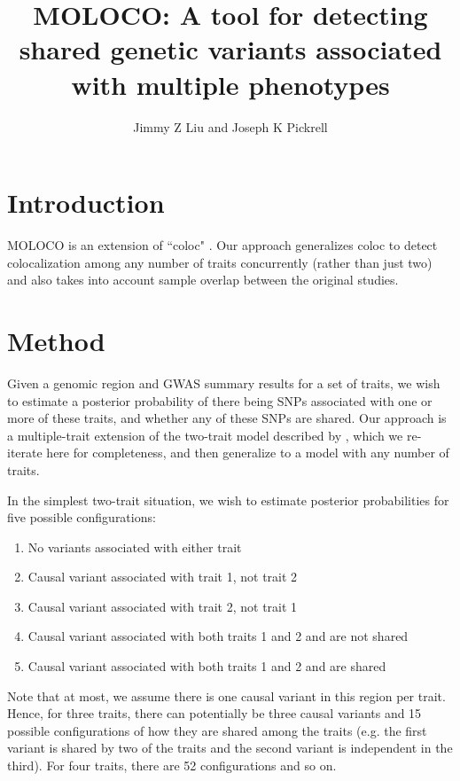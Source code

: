 \documentclass{article}
\begin{document}
\title{MOLOCO: A tool for detecting shared genetic variants associated with multiple phenotypes}
\author{Jimmy Z Liu and Joseph K Pickrell}
\maketitle


\section{Introduction}
MOLOCO is an extension of ``coloc" \citep{Giambartolomei:2014aa}. Our approach generalizes coloc to detect colocalization among any number of traits concurrently (rather than just two) and also takes into account sample overlap between the original studies.


\section{Method}

Given a genomic region and GWAS summary results for a set of traits, we wish to estimate a posterior probability of there being SNPs associated with one or more of these traits, and whether any of these SNPs are shared. Our approach is a multiple-trait extension of the two-trait model described by \cite{Giambartolomei:2014aa}, which we re-iterate here for completeness, and then generalize to a model with any number of traits.

In the simplest two-trait situation, we wish to estimate posterior probabilities for five possible configurations:
\begin{enumerate}[start=0]
  \item No variants associated with either trait
  \item Causal variant associated with trait 1, not trait 2
  \item Causal variant associated with trait 2, not trait 1
  \item Causal variant associated with both traits 1 and 2 and are not shared
  \item Causal variant associated with both traits 1 and 2 and are shared
\end{enumerate}

\noindent Note that at most, we assume there is one causal variant in this region per trait. Hence, for three traits, there can potentially be three causal variants and 15 possible configurations of how they are shared among the traits (e.g. the first variant is shared by two of the traits and the second variant is independent in the third). For four traits, there are 52 configurations and so on.
\end{document}
